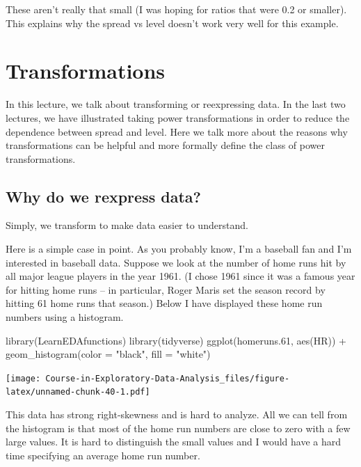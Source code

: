 \documentclass[
]{book}
\newenvironment{Shaded}{\begin{snugshade}}{\end{snugshade}}
\newcommand{\AttributeTok}[1]{\textcolor[rgb]{0.77,0.63,0.00}{#1}}
\newcommand{\FloatTok}[1]{\textcolor[rgb]{0.00,0.00,0.81}{#1}}
\newcommand{\FunctionTok}[1]{\textcolor[rgb]{0.00,0.00,0.00}{#1}}
\newcommand{\NormalTok}[1]{#1}
\newcommand{\SpecialCharTok}[1]{\textcolor[rgb]{0.00,0.00,0.00}{#1}}
\newcommand{\StringTok}[1]{\textcolor[rgb]{0.31,0.60,0.02}{#1}}
\begin{document}
These aren't really that small (I was hoping for ratios that were 0.2 or smaller). This explains why the spread vs level doesn't work very well for this example.

\hypertarget{transformations}{%
\chapter{Transformations}\label{transformations}}

In this lecture, we talk about transforming or reexpressing data. In the last two lectures, we have illustrated taking power transformations in order to reduce the dependence between spread and level. Here we talk more about the reasons why transformations can be helpful and more formally define the class of power transformations.

\hypertarget{why-do-we-rexpress-data}{%
\section{Why do we rexpress data?}\label{why-do-we-rexpress-data}}

Simply, we transform to make data easier to understand.

Here is a simple case in point. As you probably know, I'm a baseball fan and I'm interested in baseball data. Suppose we look at the number of home runs hit by all major league players in the year 1961. (I chose 1961 since it was a famous year for hitting home runs -- in particular, Roger Maris set the season record by hitting 61 home runs that season.) Below I have displayed these home run numbers using a histogram.

\begin{Shaded}
\begin{Highlighting}[]
\FunctionTok{library}\NormalTok{(LearnEDAfunctions)}
\FunctionTok{library}\NormalTok{(tidyverse)}
\FunctionTok{ggplot}\NormalTok{(homeruns}\FloatTok{.61}\NormalTok{, }\FunctionTok{aes}\NormalTok{(HR)) }\SpecialCharTok{+}
  \FunctionTok{geom\_histogram}\NormalTok{(}\AttributeTok{color =} \StringTok{"black"}\NormalTok{, }\AttributeTok{fill =} \StringTok{"white"}\NormalTok{)}
\end{Highlighting}
\end{Shaded}

\texttt{[image: Course-in-Exploratory-Data-Analysis\_files/figure-latex/unnamed-chunk-40-1.pdf]}

This data has strong right-skewness and is hard to analyze. All we can tell from the histogram is that most of the home run numbers are close to zero with a few large values. It is hard to distinguish the small values and I would have a hard time specifying an average home run number.
\end{document}
